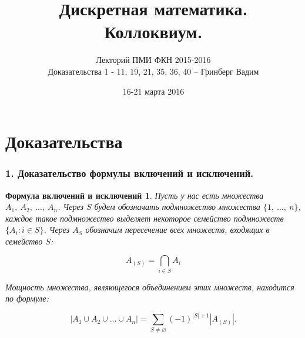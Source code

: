 \documentclass[a4paper, 12pt]{article}
\newtheorem*{vkliskl}{Формула включений и исключений}
\begin{document}
\title{Дискретная математика.\\ Коллоквиум.}
\author{Лекторий ПМИ ФКН 2015-2016 \\ Доказательства 1 - 11, 19, 21, 35, 36, 40 -- Гринберг Вадим}
\date{16-21 марта 2016}

\maketitle

\part*{Доказательства}

\section*{1. Доказательство формулы включений и исключений.}

\begin{vkliskl}
Пусть у нас есть множества $A_1,\ A_2,\ \ldots,\ A_n$. Через
$S$ будем обозначать подмножество множества $\{1,\ \ldots,\ n\}$, каждое такое подмножество выделяет некоторое семейство подмножеств $\{A_i: i \in S\}$. Через $A_S$ обозначим
пересечение всех множеств, входящих в семейство $S$:

    \[
        A_{(S)} = \bigcap\limits_{i \in S}  A_i
    \]

Мощность множества, являющегося объединением этих множеств, находится по формуле:
    
    \[
        |A_1 \cup A_2 \cup \ldots \cup A_n| = \sum\limits_{S \neq \varnothing} (-1)^{|S| + 1} |A_{(S)}|. 
    \]
    
\end{vkliskl}
\end{document}
